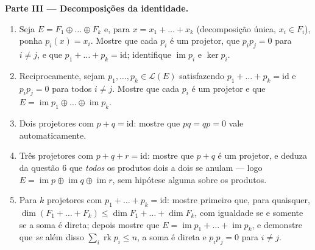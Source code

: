\begin{problem}
\medskip
\noindent\textbf{Parte III --- Decomposições da identidade.}
\begin{enumerate}[resume]
  \item Seja $E = F_1 \oplus \dots \oplus F_k$ e, para $x = x_1 +
        \dots + x_k$ (decomposição única, $x_i \in F_i$),
        ponha $p_i(x) = x_i$. Mostre que cada $p_i$ é um projetor, que
        $p_i p_j = 0$ para $i \neq j$, e que $p_1 + \dots + p_k
        = \mathrm{id}$; identifique $\operatorname{im} p_i$ e $\ker p_i$.
  \item Reciprocamente, sejam $p_1, \dots, p_k \in \mathcal{L}(E)$ satisfazendo $p_1 + \dots + p_k = \mathrm{id}$ e $p_i p_j =
        0$
        para todos $i \neq j$. Mostre que cada $p_i$ é um projetor e
        que $E = \operatorname{im} p_1 \oplus
        \dots \oplus \operatorname{im} p_k$.
  \item Dois projetores com $p + q = \mathrm{id}$: mostre que $pq
        = qp = 0$ vale
        automaticamente.
  \item Três projetores com $p + q + r = \mathrm{id}$: mostre que $p + q$ é um
        projetor, e deduza da questão 6 que \emph{todos} os
        produtos dois a dois se anulam --- logo $E =
        \operatorname{im} p \oplus \operatorname{im} q \oplus
        \operatorname{im} r$, sem
        hipótese alguma sobre os produtos.
  \item Para $k$ projetores com $p_1 + \dots + p_k =
        \mathrm{id}$: mostre primeiro que, para
         quaisquer, $\dim
        (F_1 + \dots + F_k) \leq \dim F_1 + \dots + \dim F_k$, com igualdade se e somente se
        a soma é direta; depois mostre que $E = \operatorname{im} p_1 + \dots +
        \operatorname{im} p_k$, e demonstre que
        \emph{se} além disso $\sum_i \operatorname{rk} p_i \leq n$, a soma é direta e $p_i p_j = 0$ para
        $i \neq j$.
\end{enumerate}


\end{problem}
